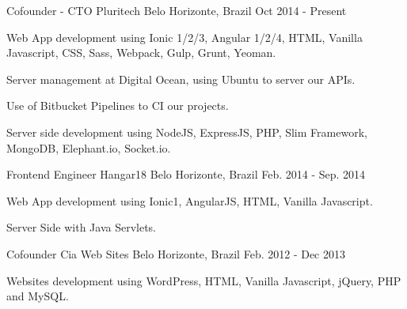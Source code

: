 

\begin{cventries}

  \cventry
    {Cofounder - CTO} %
    {Pluritech} %
    {Belo Horizonte, Brazil} %
    {Oct 2014 - Present} %
    {
      \begin{cvitems} %
        \item {Web App development using Ionic 1/2/3, Angular 1/2/4, HTML, Vanilla Javascript, CSS, Sass, Webpack, Gulp, Grunt, Yeoman.}
        \item {Server management at Digital Ocean, using Ubuntu to server our APIs.}
        \item {Use of Bitbucket Pipelines to CI our projects.}
        \item {Server side development using NodeJS, ExpressJS, PHP, Slim Framework, MongoDB, Elephant.io, Socket.io.}
      \end{cvitems}
    }

  \cventry
    {Frontend Engineer} %
    {Hangar18} %
    {Belo Horizonte, Brazil} %
    {Feb. 2014  - Sep. 2014} %
    {
      \begin{cvitems} %
        \item {Web App development using Ionic1, AngularJS, HTML, Vanilla Javascript.}
        \item {Server Side with Java Servlets.}
      \end{cvitems}
    }

  \cventry
    {Cofounder} %
    {Cia Web Sites} %
    {Belo Horizonte, Brazil} %
    {Feb. 2012 - Dec 2013} %
    {
      \begin{cvitems} %
        \item {Websites development using WordPress, HTML, Vanilla Javascript, jQuery, PHP and MySQL.}
      \end{cvitems}
    }


\end{cventries}
